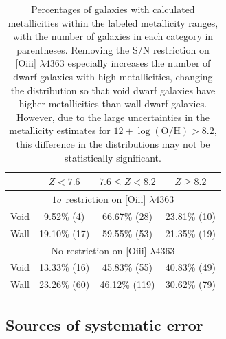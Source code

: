 \begin{table}
    \centering
    \begin{tabular}{cccc}
        \hline
         & $Z < 7.6$ & $7.6 \leq Z < 8.2$ & $Z \geq 8.2$\\
        \hline
        \hline
        \multicolumn{4}{c}{$1 \sigma$ restriction on [O{\sc iii}] $\lambda 4363$}\\
        \hline
        Void & 9.52\% (4)   & 66.67\% (28) & 23.81\% (10)\\
        Wall & 19.10\% (17) & 59.55\% (53) & 21.35\% (19)\\
        \hline
        \multicolumn{4}{c}{No restriction on [O{\sc iii}] $\lambda 4363$}\\
        \hline
        Void & 13.33\% (16) & 45.83\% (55)  & 40.83\% (49)\\
        Wall & 23.26\% (60) & 46.12\% (119) & 30.62\% (79)\\
        \hline
    \end{tabular}
    \caption[Metallicity distribution of 135 dwarf galaxy sample]{Percentages of 
    galaxies with calculated metallicities within the labeled metallicity 
    ranges, with the number of galaxies in each category in parentheses.  
    Removing the S/N restriction on [O{\sc iii}] $\lambda 4363$ especially 
    increases the number of dwarf galaxies with high metallicities, changing the 
    distribution so that void dwarf galaxies have higher metallicities than wall 
    dwarf galaxies.  However, due to the large uncertainties in the metallicity 
    estimates for $12 + \log (\text{O}/\text{H}) > 8.2$, this difference in the 
    distributions may not be statistically significant.\label{tab:Percents}}
\end{table}


\subsection{Sources of systematic error}

